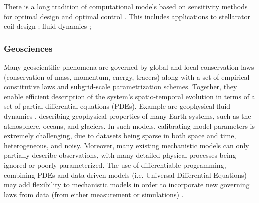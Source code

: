 There is a long tradition of computational models based on sensitivity methods for optimal design and optimal control \cite{lions1971optimal, pironneau2005optimal, allaire2014shape}.
This includes applications to 
stellarator coil design \cite{McGreivy_stellarator_2021}; 
fluid dynamics \cite{Giles_Pierce_2000, mohammadi2009applied};



\subsubsection{Geosciences}

Many geoscientific phenomena are governed by global and local conservation laws (conservation of mass, momentum, energy, tracers) along with a set of empirical constitutive laws and subgrid-scale parametrization schemes. 
Together, they enable efficient description of the system's spatio-temporal evolution in terms of a set of partial differential equations (PDEs).
Example are geophysical fluid dynamics \cite{Vallis:2016kv}, describing geophysical properties of many Earth systems, such as the atmosphere, oceans, and glaciers.
In such models, calibrating model parameters is extremely challenging, due to datasets being sparse in both space and time, heterogeneous, and noisy.
Moreover, many existing mechanistic models can only partially describe observations, with many detailed physical processes being ignored or poorly parameterized. 
The use of differentiable programming, combining PDEs and data-driven models (i.e. Universal Differential Equations) may add flexibility to mechanistic models in order to incorporate new governing laws from data (from either measurement or simulations) \cite{rackauckas2020universal}.

